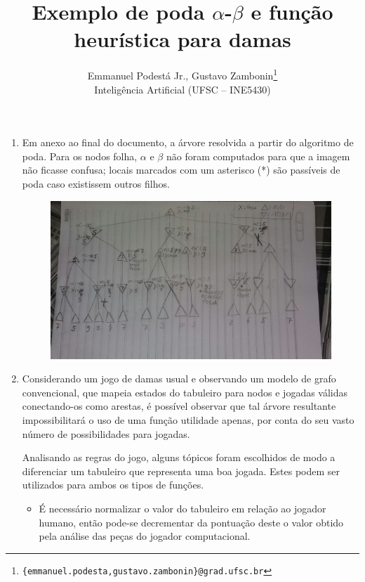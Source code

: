 \documentclass{article}
\title{\textbf{Exemplo de poda $\alpha$-$\beta$ e função heurística para damas}}
\author{Emmanuel Podestá Jr., Gustavo Zambonin\thanks{
    \texttt{\{emmanuel.podesta,gustavo.zambonin\}@grad.ufsc.br}} \\
\small {Inteligência Artificial (UFSC -- INE5430)} \vspace{-5mm}}
\date{}
\begin{document}
\maketitle

\begin{enumerate}[label=\textbf{\arabic*})]

    \item Em anexo ao final do documento, a árvore resolvida a partir do
    algoritmo de poda. Para os nodos folha, $\alpha$ e $\beta$ não foram
    computados para que a imagem não ficasse confusa; locais marcados com
    um asterisco (*) são passíveis de poda caso existissem outros filhos.

    \begin{figure}
        \centering
        \includegraphics[width=1\textwidth]{arvore.jpg}
    \end{figure}

    \item Considerando um jogo de damas usual e observando um modelo de grafo
    convencional, que mapeia estados do tabuleiro para nodos e jogadas válidas
    conectando-os como arestas, é possível observar que tal árvore resultante
    impossibilitará o uso de uma função utilidade apenas, por conta do seu
    vasto número de possibilidades para jogadas.

    Analisando as regras do jogo, alguns tópicos foram escolhidos de modo a
    diferenciar um tabuleiro que representa uma boa jogada. Estes podem ser
    utilizados para ambos os tipos de funções.

    \begin{itemize}

        \item É necessário normalizar o valor do tabuleiro em relação ao
        jogador humano, então pode-se decrementar da pontuação deste o valor
        obtido pela análise das peças do jogador computacional.


\end{itemize}
\end{enumerate}
\end{document}
